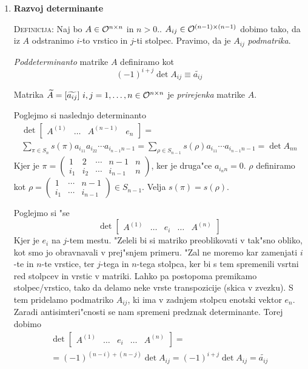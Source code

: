 \begin{enumerate}
	\item \textbf{Razvoj determinante}
	
	\textsc{Definicija:} Naj bo $A \in \mathcal{O}^{n \times n}$ in $n > 0$.. $A_{ij} \in \mathcal{O}^{(n-1) \times (n-1)}$ dobimo tako, da iz $A$ odstranimo $i$-to vrstico in $j$-ti stolpec. Pravimo, da je $A_{ij}$ \emph{podmatrika}.
	
	\emph{Poddeterminanto} matrike $A$ definiramo kot
	\begin{equation*}
	(-1)^{i + j} \det A_{ij} \equiv \widetilde{a_{ij}}
	\end{equation*}
	
	Matrika $\widetilde{A} = [\widetilde{a_{ij}}]\ i,j = 1, \ldots, n \in \mathcal{O}^{n \times n}$ je \emph{prirejenka} matrike $A$.
	
	Poglejmo si naslednjo determinanto
	\begin{multline*}
	\det \begin{bmatrix}A^{(1)} & \ldots & A^{(n-1)} & e_n\end{bmatrix} = \\
	\sum_{\pi \in S_n} s(\pi) a_{i_11} a_{i_22} \cdots a_{i_{n-1}n-1} = \sum_{\rho \in S_{n-1}} s(\rho) a_{i_11} \cdots a_{i_{n-1}n-1} = \det A_{nn}
	\end{multline*}
	Kjer je $\pi = \begin{pmatrix}
	1 & 2 & \cdots & n-1 & n \\
	i_1 & i_2 & \cdots & i_{n-1} & n
	\end{pmatrix}$, ker je druga"ce $a_{i_nn} = 0$. $\rho$ definiramo kot $\rho = \begin{pmatrix}
	1 & \cdots & n-1 \\
	i_1 & \cdots & i_{n-1}
	\end{pmatrix} \in S_{n-1}$. Velja $s(\pi) = s(\rho)$.

	Poglejmo si "se
	\begin{equation*}
	\det \begin{bmatrix}A^{(1)} & \ldots & e_i & \ldots & A^{(n)}\end{bmatrix}
	\end{equation*}
	Kjer je $e_i$ na $j$-tem mestu. "Zeleli bi si matriko preoblikovati v tak"sno obliko, kot smo jo obravnavali v prej"snjem primeru. "Zal ne moremo kar zamenjati $i$-te in $n$-te vrstice, ter $j$-tega in $n$-tega stolpca, ker bi s tem spremenili vsrtni red stolpcev in vrstic v matriki. Lahko pa postopoma premikamo stolpec/vrstico, tako da delamo neke vrste transpozicije (skica v zvezku). S tem pridelamo podmatriko $A_{ij}$, ki ima v zadnjem stolpcu enotski vektor $e_n$. Zaradi antisimteri"cnosti se nam spremeni predznak determinante. Torej dobimo
	\begin{multline*}
	\det \begin{bmatrix}A^{(1)} & \ldots & e_i & \ldots & A^{(n)}\end{bmatrix} = \\
	= (-1)^{(n - i) + (n-j)} \det A_{ij} = (-1)^{i + j} \det A_{ij} = \widetilde{a_{ij}}
	\end{multline*}
	

\end{enumerate}
